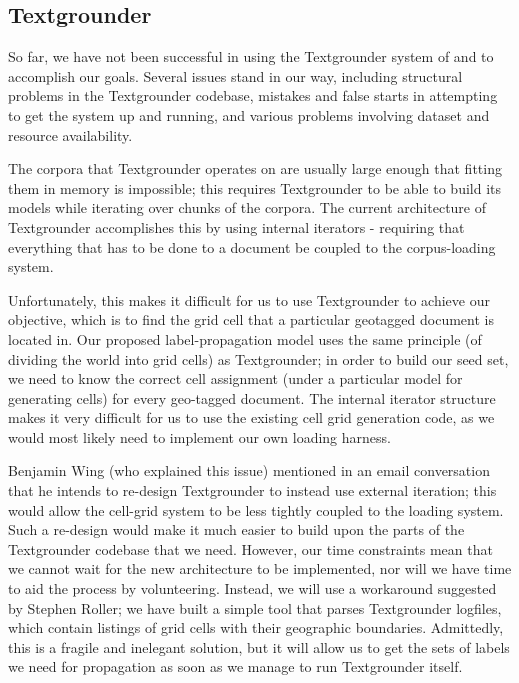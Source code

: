\subsection{Textgrounder}
So far, we have not been successful in using the Textgrounder system of 
\cite{wing-baldridge:11} and \cite{rolleretal:12} to accomplish our goals. 
Several issues stand in our way, including structural problems in the
Textgrounder codebase, mistakes and false starts in attempting to get
the system up and running, and various problems involving dataset and resource
availability.
\par
The corpora that Textgrounder operates on are usually large enough that fitting them
in memory is impossible; this requires Textgrounder to be able to
build its models while iterating over chunks of the corpora.
The current architecture of Textgrounder accomplishes this by using internal
iterators - requiring that everything that has to be done to a document be
coupled to the corpus-loading system.
\par
Unfortunately, this makes it difficult for us to use Textgrounder to achieve
our objective, which is to find the grid cell that a particular geotagged document is located in.
Our proposed label-propagation model uses the same principle (of dividing the
world into grid cells) as Textgrounder; in order to build our seed set, we need to
know the correct cell assignment (under a particular model for generating
cells) for every geo-tagged document.
The internal iterator structure makes it very difficult for us to use the
existing cell grid generation code, as we would most likely need to implement our own
loading harness.
\par
Benjamin Wing (who explained this issue) mentioned in an email conversation that he intends to re-design
Textgrounder to instead use external iteration; this would allow the cell-grid
system to be less tightly coupled to the loading system.
Such a re-design would make it much easier to build upon the parts of the
Textgrounder codebase that we need. However, our time constraints mean that we cannot wait for the new architecture to be implemented, nor will we have
time to aid the process by volunteering.
Instead, we will use a workaround suggested by Stephen Roller; we have built a
simple tool that parses Textgrounder logfiles, which contain listings of grid
cells with their geographic boundaries.
Admittedly, this is a fragile and inelegant solution, but it will allow us to
get the sets of labels we need for propagation as soon as we manage to run
Textgrounder itself.
